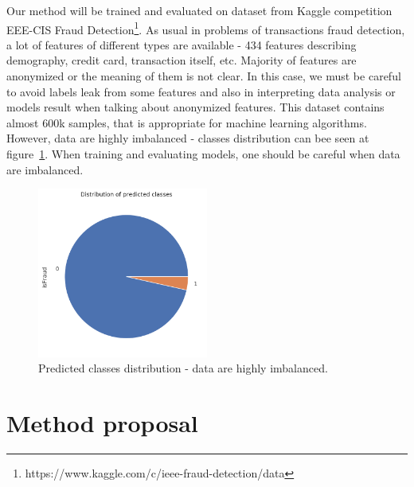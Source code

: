 \documentclass[runningheads]{llncs}
\begin{document}
Our method will be trained and evaluated on dataset from Kaggle competition EEE-CIS Fraud Detection\footnote{https://www.kaggle.com/c/ieee-fraud-detection/data}. As usual in problems of transactions fraud detection, a lot of features of different types are available - 434 features describing demography, credit card, transaction itself, etc. Majority of features are anonymized or the meaning of them is not clear. In this case, we must be careful to avoid labels leak from some features and also in interpreting data analysis or models result when talking about anonymized features. This dataset contains almost 600k samples, that is appropriate for machine learning algorithms. However, data are highly imbalanced - classes distribution can bee seen at figure~\ref{fig:classes}. When training and evaluating models, one should be careful when data are imbalanced.

\begin{figure}[ht]
	\begin{center}
	    \includegraphics[width=0.5\textwidth]{figures/class_distribution.png}
    \end{center}
	\caption{Predicted classes distribution - data are highly imbalanced.}
	\label{fig:classes}
\end{figure}


\section{Method proposal}



\end{document}
